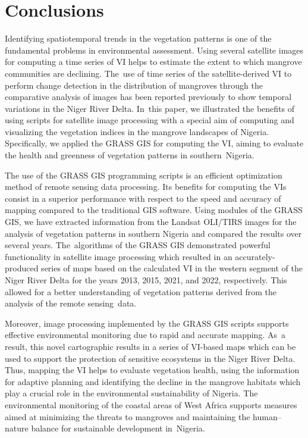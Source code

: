 \documentclass[jmse,article,accept,pdftex,moreauthors]{Definitions/mdpi}
\begin{document}
\section{Conclusions}

Identifying spatiotemporal trends in the vegetation patterns is one of the fundamental problems in environmental assessment. Using several satellite images for computing a time series of VI helps to estimate the extent to which mangrove communities are declining. The~use of time series of the satellite-derived VI to perform change detection in the distribution of mangroves through the comparative analysis of images has been reported previously to show temporal variations in the Niger River Delta. In~this paper, we illustrated the benefits of using scripts for satellite image processing with a special aim of computing and visualizing the vegetation indices in the mangrove landscapes of Nigeria. Specifically, we applied the GRASS GIS for computing the VI, aiming to evaluate the health and greenness of vegetation patterns in southern~Nigeria. 

The use of the GRASS GIS programming scripts is an efficient optimization method of remote sensing data processing. Its benefits for computing the VIs consist in a superior performance with respect to the speed and accuracy of mapping compared to the traditional GIS software. Using modules of the GRASS GIS, we have extracted information from the Landsat OLI/TIRS images for the analysis of vegetation patterns in southern Nigeria and compared the results over several years. The~algorithms of the GRASS GIS demonstrated powerful functionality in satellite image processing which resulted in an accurately-produced series of maps based on the calculated VI in the western segment of the Niger River Delta for the years 2013, 2015, 2021, and 2022, respectively. This allowed for a better understanding of vegetation patterns derived from the analysis of the remote sensing~data. 

Moreover, image processing implemented by the GRASS GIS scripts supports effective environmental monitoring due to rapid and accurate mapping. As~a result, this novel cartographic results in a series of VI-based maps which can be used to support the protection of sensitive ecosystems in the Niger River Delta. Thus, mapping the VI helps to evaluate vegetation health, using the information for adaptive planning and identifying the decline in the mangrove habitats which play a crucial role in the environmental sustainability of Nigeria. The environmental monitoring of the coastal areas of West Africa supports measures aimed at minimizing the threats to mangroves and maintaining the human--nature balance for sustainable development in~Nigeria. 
\vspace{6pt}
\end{document}
